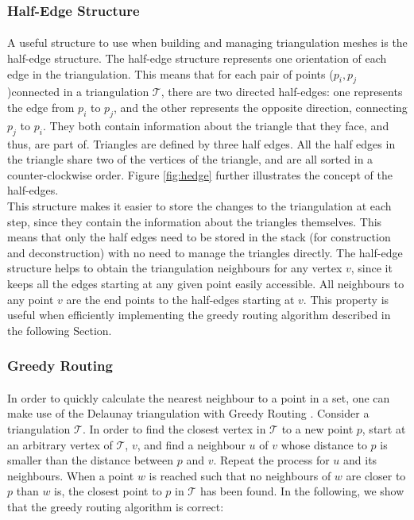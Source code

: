\subsubsection*{Half-Edge Structure}
\paragraph{}
A useful structure to use when building and managing triangulation meshes is the half-edge structure. The half-edge structure represents one orientation of each edge in the triangulation. This means that for each pair of points ($p_i,p_j$)connected in a triangulation $\mathcal{T}$, there are two directed half-edges: one represents the edge from $p_i$ to $p_j$, and the other represents the opposite direction, connecting $p_j$ to $p_i$. They both contain information about the triangle that they face, and thus, are part of. Triangles are defined by three half edges. All the half edges in the triangle share two of the vertices of the triangle, and are all sorted in a counter-clockwise order. 
Figure \ref{fig:hedge} further illustrates the concept of the half-edges.\\

This structure makes it easier to store the changes to the triangulation at each step, since they contain the information about the triangles themselves. This means that only the half edges need to be stored in the stack (for construction and deconstruction) with no need to manage the triangles directly.
The half-edge structure helps to obtain the triangulation neighbours for any vertex $v$, since it keeps all the edges starting at any given point easily accessible. All neighbours to any point $v$ are the end points to the half-edges starting at $v$. This property is useful when efficiently implementing the greedy routing algorithm described in the following Section. 

\subsubsection*{Greedy Routing}
\label{r:gr}
\paragraph{}
In order to quickly calculate the nearest neighbour to a point in a set, one can make use of the Delaunay triangulation with Greedy Routing \cite{greedyroute}.
Consider a triangulation $\mathcal{T}$. In order to find the closest vertex in $\mathcal{T}$ to a new point $p$, start at an arbitrary vertex of $\mathcal{T}$, $v$, and find a neighbour $u$ of $v$ whose distance to $p$ is smaller than the distance between $p$ and $v$. Repeat the process for $u$ and its neighbours. When a point $w$ is reached such that no neighbours of $w$ are closer to $p$ than $w$ is, the closest point to $p$ in $\mathcal{T}$ has been found. In the following, we show that the greedy routing algorithm is correct:

\noindent
